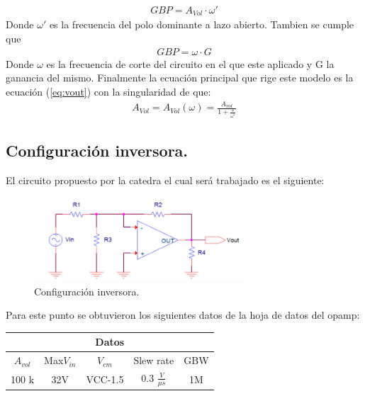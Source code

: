 \begin{align} GBP= A_{Vol} \cdot \omega' \end{align}
Donde $\omega'$ es la frecuencia del polo dominante a lazo abierto.
Tambien se cumple que 
\begin{align} GBP=\omega \cdot G \end{align}
Donde $\omega$ es la frecuencia de corte del circuito en el que este aplicado y G la ganancia del mismo.
Finalmente la ecuación principal que rige este modelo es la ecuación (\ref{eq:vout}) con la singularidad de que:
\begin{align} A_{Vol} = A_{Vol}(\omega ) = \frac{A_{vol}}{1+\frac{s}{\omega '}} \end{align}

\subsection{Configuración inversora.}
El circuito propuesto por la catedra el cual será trabajado es el siguiente:

\begin{figure}[htb]	
	\centering
	\includegraphics[width=0.7\textwidth]{Ejercicio1/Imagenes/Circuitoinversor.PNG}
	\caption{Configuración inversora.}
	\label{fig:ConfInv}
\end{figure}
Para este punto se obtuvieron los siguientes datos de la hoja de datos del opamp:
\begin{table}[H]
\begin{center}
\label{tab:datos}
\begin{tabular}{|c|c|c|c|c|}
\hline
\multicolumn{5}{|c|}{\textbf{Datos}}                                      \\ \hline
\textbf{$A_{vol}$} & Max$V_{in}$ & $V_{cm}$ & Slew rate             & GBW \\ \hline
100 k              & 32V         & VCC-1.5  & 0.3 $\frac{V}{\mu s}$ & 1M  \\ \hline
\end{tabular}
\end{center}
\end{table}

